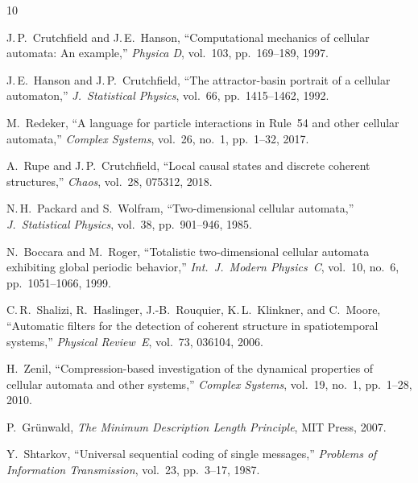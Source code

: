 \documentclass[11pt]{article}
\theoremstyle{definition}
\theoremstyle{remark}
\begin{document}
\begin{thebibliography}{10}

J.\,P.~Crutchfield and J.\,E.~Hanson,
``Computational mechanics of cellular automata: An example,''
\emph{Physica D}, vol.~103, pp.~169--189, 1997.

J.\,E.~Hanson and J.\,P.~Crutchfield,
``The attractor-basin portrait of a cellular automaton,''
\emph{J.\ Statistical Physics}, vol.~66, pp.~1415--1462, 1992.

M.~Redeker,
``A language for particle interactions in Rule~54 and other cellular automata,''
\emph{Complex Systems}, vol.~26, no.~1, pp.~1--32, 2017.

A.~Rupe and J.\,P.~Crutchfield,
``Local causal states and discrete coherent structures,''
\emph{Chaos}, vol.~28, 075312, 2018.

N.\,H.~Packard and S.~Wolfram,
``Two-dimensional cellular automata,''
\emph{J.\ Statistical Physics}, vol.~38, pp.~901--946, 1985.

N.~Boccara and M.~Roger,
``Totalistic two-dimensional cellular automata exhibiting global periodic behavior,''
\emph{Int.\ J.\ Modern Physics~C}, vol.~10, no.~6, pp.~1051--1066, 1999.

C.\,R.~Shalizi, R.~Haslinger, J.-B.~Rouquier, K.\,L.~Klinkner, and C.~Moore,
``Automatic filters for the detection of coherent structure in spatiotemporal systems,''
\emph{Physical Review~E}, vol.~73, 036104, 2006.

H.~Zenil,
``Compression-based investigation of the dynamical properties of cellular automata and other systems,''
\emph{Complex Systems}, vol.~19, no.~1, pp.~1--28, 2010.

P.~Gr\"unwald,
\emph{The Minimum Description Length Principle},
MIT Press, 2007.

Y.~Shtarkov,
``Universal sequential coding of single messages,''
\emph{Problems of Information Transmission}, vol.~23, pp.~3--17, 1987.

\end{thebibliography}
\end{document}
